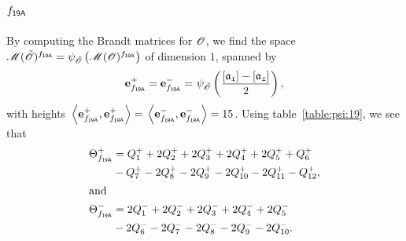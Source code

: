 \subsection{$f_\mathsf{{19A}}$}
By computing the Brandt matrices for ${\mathscr{O}}$,
we find the space $\operatorname{{\mathscr M}}({\tilde{{\mathscr{O}}}})^{f_\mathsf{{19A}}}
=\psi_{{\tilde{{\mathscr{O}}}}}\left(\operatorname{{\mathscr M}}({\mathscr{O}})^{f_\mathsf{{19A}}}\right)
$
of dimension $1$, spanned by
\begin{align*}
  \e{\mf{19A}}^+ = \e{\mf{19A}}^- = &\ \psi_{\Ot}\left(\frac{\cls{a_{1}}-\cls{a_{2}}}{2}\right),\\
\end{align*}
with heights $\,\<\e{\mf{19A}}^+,\e{\mf{19A}}^+>=\,\<\e{\mf{19A}}^-,\e{\mf{19A}}^->=15$.
Using table~\ref{table:psi:19},
we see that
\begin{align*}
  {\Theta}^+_{f_\mathsf{{19A}}} & =  Q_{1}^{+} + 2Q_{2}^{+} + 2Q_{3}^{+} + 2Q_{4}^{+} + 2Q_{5}^{+} + Q_{6}^{+} \\ & - Q_{7}^{+} - 2Q_{8}^{+} - 2Q_{9}^{+} - 2Q_{10}^{+} - 2Q_{11}^{+} - Q_{12}^{+}, \\
\intertext{and}
  {\Theta}^-_{f_\mathsf{{19A}}} & =  2Q_{1}^{-} + 2Q_{2}^{-} + 2Q_{3}^{-} + 2Q_{4}^{-} + 2Q_{5}^{-} \\ & - 2Q_{6}^{-} - 2Q_{7}^{-} - 2Q_{8}^{-} - 2Q_{9}^{-} - 2Q_{10}^{-}. \\
\end{align*}
